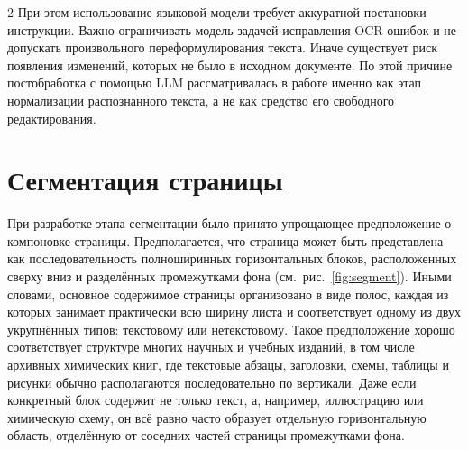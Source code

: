 \documentclass[11pt]{article}
\begin{document}
\begin{multicols}{2}
При этом использование языковой модели требует аккуратной постановки инструкции. Важно ограничивать модель задачей исправления OCR-ошибок и не допускать произвольного переформулирования текста. Иначе существует риск появления изменений, которых не было в исходном документе. По этой причине постобработка с помощью LLM рассматривалась в работе именно как этап нормализации распознанного текста, а не как средство его свободного редактирования. 
\section{Сегментация страницы}
При разработке этапа сегментации было принято упрощающее предположение о компоновке страницы. Предполагается, что страница может быть представлена как последовательность полноширинных горизонтальных блоков, расположенных сверху вниз и разделённых промежутками фона (см.~рис.~\ref{fig:segment}). Иными словами, основное содержимое страницы организовано в виде полос, каждая из которых занимает практически всю ширину листа и соответствует одному из двух укрупнённых типов: текстовому или нетекстовому.
Такое предположение хорошо соответствует структуре многих научных и учебных изданий, в том числе архивных химических книг, где текстовые абзацы, заголовки, схемы, таблицы и рисунки обычно располагаются последовательно по вертикали.
Даже если конкретный блок содержит не только текст, а, например, иллюстрацию или химическую схему, он всё равно часто образует отдельную горизонтальную область, отделённую от соседних частей страницы промежутками фона.


\end{multicols}
\end{document}
